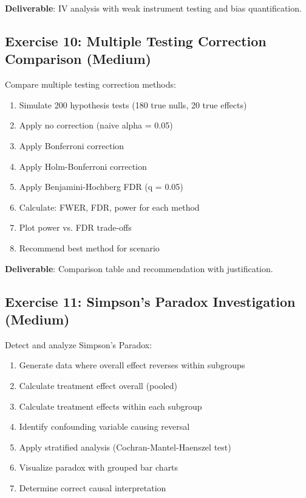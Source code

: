 \textbf{Deliverable}: IV analysis with weak instrument testing and bias quantification.

\subsection{Exercise 10: Multiple Testing Correction Comparison (Medium)}

Compare multiple testing correction methods:

\begin{enumerate}
    \item Simulate 200 hypothesis tests (180 true nulls, 20 true effects)
    \item Apply no correction (naive alpha = 0.05)
    \item Apply Bonferroni correction
    \item Apply Holm-Bonferroni correction
    \item Apply Benjamini-Hochberg FDR (q = 0.05)
    \item Calculate: FWER, FDR, power for each method
    \item Plot power vs. FDR trade-offs
    \item Recommend best method for scenario
\end{enumerate}

\textbf{Deliverable}: Comparison table and recommendation with justification.

\subsection{Exercise 11: Simpson's Paradox Investigation (Medium)}

Detect and analyze Simpson's Paradox:

\begin{enumerate}
    \item Generate data where overall effect reverses within subgroups
    \item Calculate treatment effect overall (pooled)
    \item Calculate treatment effects within each subgroup
    \item Identify confounding variable causing reversal
    \item Apply stratified analysis (Cochran-Mantel-Haenszel test)
    \item Visualize paradox with grouped bar charts
    \item Determine correct causal interpretation
\end{enumerate}

